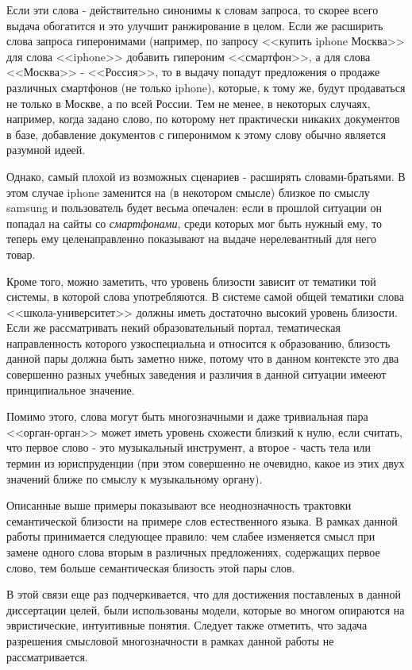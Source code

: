 Если эти слова - действительно синонимы  к словам запроса, то скорее всего выдача обогатится и это улучшит ранжирование в целом. Если же расширить слова запроса гиперонимами (например, по запросу <<купить iphone Москва>> для слова <<iphone>> добавить гипероним <<смартфон>>, а для слова <<Москва>> - <<Россия>>, то в выдачу попадут предложения о продаже различных смартфонов (не только iphone), которые, к тому же, будут продаваться не только в Москве, а по всей России. Тем не менее, в некоторых случаях, например, когда задано слово, по которому нет практически никаких документов в базе, добавление документов с гиперонимом к этому слову обычно является разумной идеей.

Однако, самый плохой из возможных сценариев - расширять словами-братьями. В этом случае iphone заменится на (в некотором смысле) близкое по смыслу samsung и пользователь будет весьма опечален: если в прошлой ситуации он попадал на сайты со \emph{смартфонами}, среди которых мог быть нужный ему, то теперь ему целенаправленно показывают на выдаче нерелевантный для него товар.

Кроме того, можно заметить, что уровень близости зависит от тематики той системы, в которой слова употребляются. В системе самой общей тематики слова <<школа-университет>> должны иметь достаточно высокий уровень близости. Если же рассматривать некий образовательный портал, тематическая направленность которого узкоспециальна и относится к образованию, близость данной пары должна быть заметно ниже, потому что в данном контексте это два совершенно разных учебных заведения и различия в данной ситуации имееют принципиальное значение.

Помимо этого, слова могут быть многозначными и даже тривиальная пара <<орган-орган>> может иметь уровень схожести близкий к нулю, если считать, что первое слово - это музыкальный инструмент, а второе - часть тела или термин из юриспруденции (при этом совершенно не очевидно, какое из этих двух значений ближе по смыслу к музыкальному органу).

Описанные выше примеры показывают все неоднозначность трактовки семантической близости на примере слов естественного языка. В рамках данной работы принимается следующее правило: чем слабее изменяется смысл при замене одного слова вторым в различных предложениях, содержащих первое слово, тем больше семантическая близость этой пары слов. 

В этой связи еще раз подчеркивается, что для достижения поставленых в данной диссертации целей, были использованы модели, которые во многом опираются на эвристические, интуитивные понятия. Следует также отметить, что задача разрешения смысловой многозначности в рамках данной работы не рассматривается.

